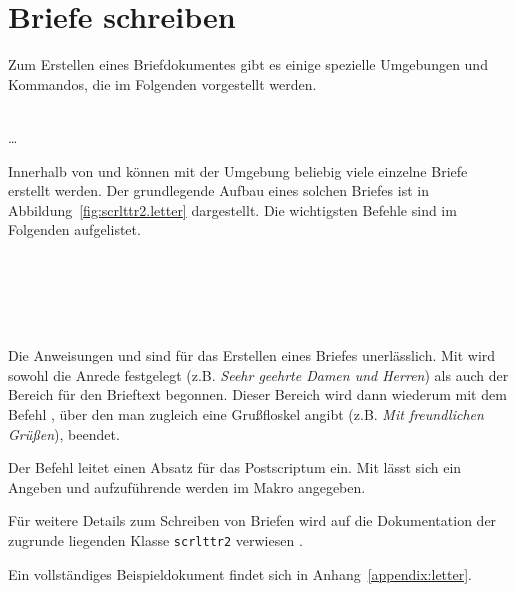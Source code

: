 \section{Briefe schreiben}

Zum Erstellen eines Briefdokumentes gibt es einige spezielle Umgebungen und
Kommandos, die im Folgenden vorgestellt werden.

\begin{Declaration}
  \\
  \quad\dots\\
\end{Declaration}

Innerhalb von \lstinline!! und \lstinline!!
können mit der Umgebung  beliebig viele einzelne Briefe
erstellt werden. Der grundlegende Aufbau eines solchen Briefes ist in
Abbildung~\ref{fig:scrlttr2.letter} dargestellt. Die wichtigsten Befehle
sind im Folgenden aufgelistet.

\begin{Declaration}
  \\
  \\
  \\
  \\
\end{Declaration}

Die Anweisungen  und  sind für das Erstellen
eines Briefes unerlässlich. Mit  wird sowohl die Anrede
festgelegt (z.B. \textit{Seehr geehrte Damen und Herren}) als auch der
Bereich für den Brieftext begonnen.
Dieser Bereich wird dann wiederum mit dem Befehl , über den
man zugleich eine Grußfloskel angibt (z.B. \textit{Mit freundlichen Grüßen}),
beendet.

Der Befehl  leitet einen Absatz für das Postscriptum ein.
Mit  lässt sich ein  Angeben und
aufzuführende  werden im Makro  angegeben.

Für weitere Details zum Schreiben von Briefen wird auf die Dokumentation
der zugrunde liegenden Klasse \lstinline{scrlttr2} verwiesen
\cite[S.162ff]{koma-skript}.

Ein vollständiges Beispieldokument findet sich in Anhang~\ref{appendix:letter}.

